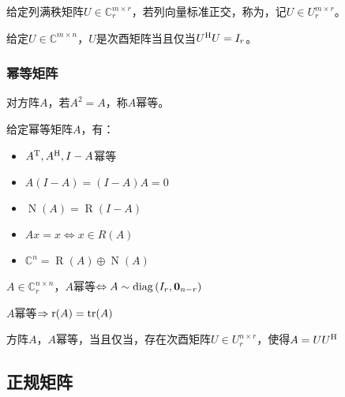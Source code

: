 \begin{definition}[次酉矩阵]
    给定列满秩矩阵$U\in \mathbb{C}^{m\times r}_r$，若列向量标准正交，称为，记$U\in U^{m\times r}_r$。
\end{definition}

\begin{theorem}
    给定$U\in \mathbb{C}^{m\times n}$，$U$是次酉矩阵当且仅当$U^\mathrm{H} U=I_r$。
\end{theorem}

\subsubsection{幂等矩阵}

\begin{definition}
    对方阵$A$，若$A^2=A$，称$A$幂等。
\end{definition}

\begin{property}
    给定幂等矩阵$A$，有：
    \begin{itemize}
        \item $A^\mathrm{T},A^\mathrm{H},I-A$幂等
        \item $A(I-A)=(I-A)A=0$
        \item $\operatorname{N}(A)=\operatorname{R}(I-A)$
        \item $Ax=x\Leftrightarrow x\in R(A)$
        \item $\mathbb{C}^n=\operatorname{R}(A)\oplus \operatorname{N}(A)$
    \end{itemize}
\end{property}

\begin{theorem}
    $A\in \mathbb{C}^{n\times n}_r$，$A$幂等$\Leftrightarrow A\sim \operatorname{diag}{(I_r,\bm{0}_{n-r})}$
\end{theorem}

\begin{corollary}
    $A$幂等$\Rightarrow \operatorname{r}(A)=\operatorname{tr}(A)$
\end{corollary}

\begin{theorem}
    方阵$A$，$A$幂等，当且仅当，存在次酉矩阵$U\in U^{n\times r}_r$，使得$A=U U^\mathrm{H}$
\end{theorem}

\subsection{正规矩阵}


